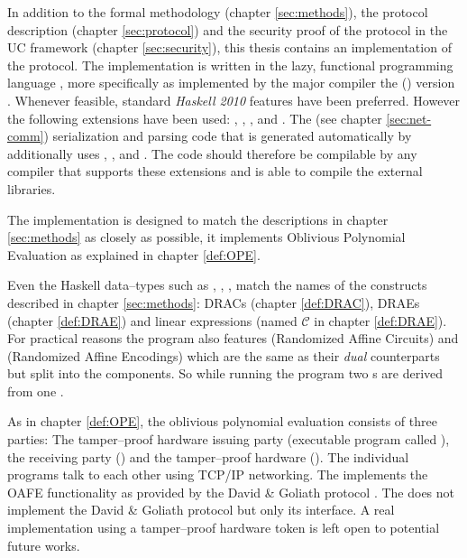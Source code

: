 \label{sec:implementation}

In addition to the formal methodology (chapter \ref{sec:methods}), the protocol
description (chapter \ref{sec:protocol}) and the security proof of the protocol
in the UC framework (chapter \ref{sec:security}), this thesis contains an
implementation of the protocol. The implementation is written in the lazy,
functional programming language \JWTLhaskell{}, more specifically \JWThaskell{}
as implemented by the major \JWThaskell{} compiler the \JWTXLghc{} (\JWTghc{})
version \JWTVghc{}. Whenever feasible, standard \emph{Haskell 2010}
\cite{haskell2010} features have been preferred. However the following
extensions have been used: ,
, , and
.  The \JWTprotobuf{} (see chapter
\ref{sec:net-comm}) serialization and parsing code that is generated
automatically by  additionally uses
, , and
. The code should therefore be compilable
by any \JWThaskell{} compiler that supports these extensions and is able to
compile the external libraries.

The implementation is designed to match the descriptions in chapter
\ref{sec:methods} as closely as possible, it implements Oblivious Polynomial
Evaluation as explained in chapter \ref{def:OPE}.

Even the Haskell data--types such as , , ,
 match the names of the constructs described in chapter
\ref{sec:methods}: DRACs (chapter \ref{def:DRAC}), DRAEs (chapter
\ref{def:DRAE}) and linear expressions (named $\mathcal{C}$ in chapter
\ref{def:DRAE}). For practical reasons the program also features 
(Randomized Affine Circuits) and  (Randomized Affine Encodings)
which are the same as their \emph{dual} counterparts but split into the
components. So while running the program two s are derived from one
.

As in chapter \ref{def:OPE}, the oblivious polynomial evaluation consists of
three parties: The tamper--proof hardware issuing party \JWpOne{} (executable
program called \JWBpOne{}), the receiving party \JWpTwo{} (\JWBpTwo{}) and the
tamper--proof hardware \JWtoken{} (\JWBtoken{}). The individual programs talk to
each other using TCP/IP networking. The \JWtoken{} implements the OAFE
functionality  as provided by the David \& Goliath
protocol \cite{davidgoliath}. The \JWtoken{} does not implement the
David \& Goliath protocol but only its interface. A real implementation using a
tamper--proof hardware token is left open to potential future works.



